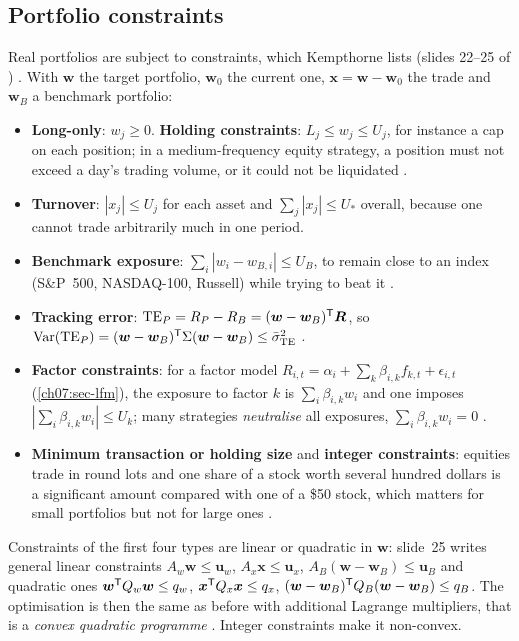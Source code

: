 \begin{paracol}{2}


\section{Portfolio constraints}\label{ch10:sec-constr}

Real portfolios are subject to constraints, which Kempthorne lists (slides 22--25 of )
. With $\bm w$ the target portfolio, $\bm w_0$ the current one, $\bm x=\bm w-\bm w_0$ the
trade and $\bm w_B$ a benchmark portfolio:
\begin{itemize}
  \item \textbf{Long-only}: $w_j\ge0$. \textbf{Holding constraints}: $L_j\le w_j\le U_j$, for instance a cap
        on each position; in a medium-frequency equity strategy, a position must not exceed a day's trading
        volume, or it could not be liquidated .
  \item \textbf{Turnover}: $|x_j|\le U_j$ for each asset and $\sum_j|x_j|\le U_*$ overall, because one cannot
        trade arbitrarily much in one period.
  \item \textbf{Benchmark exposure}: $\sum_i|w_i-w_{B,i}|\le U_B$, to remain close to an index (S\&P~500,
        NASDAQ-100, Russell) while trying to beat it .
  \item \textbf{Tracking error}: $\mathrm{TE}_P=R_P-R_B=(\bm w-\bm w_B)^{\mathsf T}\bm R$, so
        $\operatorname{Var}(\mathrm{TE}_P)=(\bm w-\bm w_B)^{\mathsf T}\Sigma(\bm w-\bm w_B)\le\bar\sigma^2_{\mathrm{TE}}$
        .
  \item \textbf{Factor constraints}: for a factor model $R_{i,t}=\alpha_i+\sum_k\beta_{i,k}f_{k,t}+\epsilon_{i,t}$
        (\cref{ch07:sec-lfm}), the exposure to factor $k$ is $\sum_i\beta_{i,k}w_i$ and one imposes
        $|\sum_i\beta_{i,k}w_i|\le U_k$; many strategies \emph{neutralise} all exposures, $\sum_i\beta_{i,k}w_i=0$
        .
  \item \textbf{Minimum transaction or holding size} and \textbf{integer constraints}: equities trade in round lots
        and one share of a stock worth several hundred dollars is a significant amount compared with one of a
        \$50 stock, which matters for small portfolios but not for large ones .
\end{itemize}
Constraints of the first four types are linear or quadratic in $\bm w$: slide~25 writes general linear constraints
$A_w\bm w\le\bm u_w$, $A_x\bm x\le\bm u_x$, $A_B(\bm w-\bm w_B)\le\bm u_B$ and quadratic ones $\bm w^{\mathsf T} Q_w\bm w\le q_w$,
$\bm x^{\mathsf T} Q_x\bm x\le q_x$, $(\bm w-\bm w_B)^{\mathsf T} Q_B(\bm w-\bm w_B)\le q_B$. The optimisation is then the same as before with
additional Lagrange multipliers, that is a \emph{convex quadratic programme} . Integer constraints make
it non-convex.


\end{paracol}
